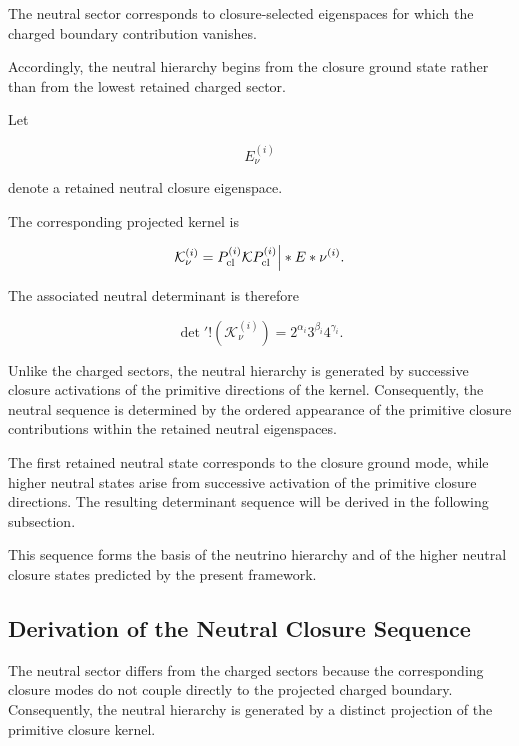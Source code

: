 \documentclass[11pt]{article}
\theoremstyle{definition}
\theoremstyle{remark}
\begin{document}
The neutral sector corresponds to closure-selected eigenspaces
for which the charged boundary contribution vanishes.

Accordingly, the neutral hierarchy begins from the closure
ground state rather than from the lowest retained charged
sector.

Let

\begin{equation}
E_{\nu}^{(i)}
\end{equation}

denote a retained neutral closure eigenspace.

The corresponding projected kernel is

\begin{equation}
\mathcal K_{\nu}^{(i)} = 
P_{\rm cl}^{(i)}
\mathcal K
P_{\rm cl}^{(i)}
\Big|*{E*{\nu}^{(i)}}.
\end{equation}

The associated neutral determinant is therefore

\begin{equation}
\det{}'
!\left(
\mathcal K_{\nu}^{(i)}
\right) = 
2^{\alpha_i}
3^{\beta_i}
4^{\gamma_i}.
\label{eq:neutral_determinant}
\end{equation}

Unlike the charged sectors, the neutral hierarchy is generated
by successive closure activations of the primitive directions of
the kernel. Consequently, the neutral sequence is determined by
the ordered appearance of the primitive closure contributions
within the retained neutral eigenspaces.

The first retained neutral state corresponds to the closure
ground mode, while higher neutral states arise from successive
activation of the primitive closure directions. The resulting
determinant sequence will be derived in the following subsection.

This sequence forms the basis of the neutrino hierarchy and of
the higher neutral closure states predicted by the present
framework.


\subsection{Derivation of the Neutral Closure Sequence}
\label{subsec:neutral_sequence_derivation}

The neutral sector differs from the charged sectors because the
corresponding closure modes do not couple directly to the
projected charged boundary. Consequently, the neutral hierarchy
is generated by a distinct projection of the primitive closure
kernel.
\end{document}
